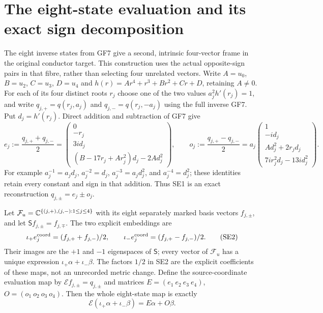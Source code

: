 \section{The eight-state evaluation and its exact sign decomposition}
The eight inverse states from GF7 give a second, intrinsic four-vector
frame in the original conductor target. This construction uses the actual
opposite-sign pairs in that fibre, rather than selecting four unrelated
vectors. Write $A=u_0$, $B=u_2$, $C=u_3$, $D=u_4$ and
$h(r)=Ar^4+r^3+Br^2+Cr+D$, retaining $A\ne0$.
For each of its four distinct roots $r_j$ choose one of the two values
$a_j^2 h'(r_j)=1$, and write $q_{j,+}=q(r_j,a_j)$ and
$q_{j,-}=q(r_j,-a_j)$ using the full inverse GF7. Put $d_j=h'(r_j)$.
Direct addition and subtraction of GF7 give
\[
 e_j:=\frac{q_{j,+}+q_{j,-}}2=
 \begin{pmatrix}0\\-r_j\\3i d_j\\
 (B-17r_j+Ar_j^2)d_j-2A d_j^2\end{pmatrix},\qquad
 o_j:=\frac{q_{j,+}-q_{j,-}}2=
 a_j\begin{pmatrix}1\\-i d_j\\A d_j^2+2r_jd_j\\
 7ir_j^2d_j-13i d_j^2\end{pmatrix}.
 \tag{SE1}
\]
For example $a_j^{-1}=a_jd_j$, $a_j^{-2}=d_j$,
$a_j^{-3}=a_jd_j^2$, and $a_j^{-4}=d_j^2$; these identities
retain every constant and sign in that addition. Thus SE1 is an exact
reconstruction $q_{j,\pm}=e_j\pm o_j$.

Let $\mathcal F_u=\mathbb C^{\{(j,+),(j,-):1\le j\le4\}}$ with its
eight separately marked basis vectors $f_{j,\pm}$, and let
$\mathsf S f_{j,\pm}=f_{j,\mp}$. The two explicit embeddings are
\[
 \iota_+e_j^{\rm coord}=(f_{j,+}+f_{j,-})/2,\qquad
 \iota_-e_j^{\rm coord}=(f_{j,+}-f_{j,-})/2.
 \tag{SE2}
\]
Their images are the $+1$ and $-1$ eigenspaces of $\mathsf S$;
every vector of $\mathcal F_u$ has a unique expression
$\iota_+\alpha+\iota_-\beta$. The factors $1/2$ in SE2 are the
explicit coefficients of these maps, not an unrecorded metric change.
Define the source-coordinate evaluation map by
$\mathcal E f_{j,\pm}=q_{j,\pm}$ and matrices
$E=(e_1\ e_2\ e_3\ e_4)$, $O=(o_1\ o_2\ o_3\ o_4)$.
Then the whole eight-state map is exactly
\[
 \mathcal E(\iota_+\alpha+\iota_-\beta)=E\alpha+O\beta.
 \tag{SE3}
\]

